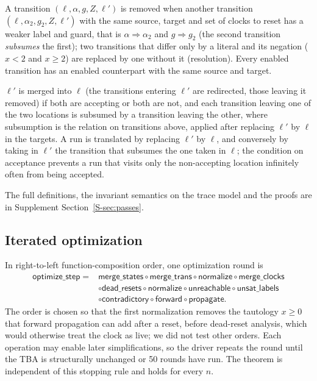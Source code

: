 \documentclass[preprint,12pt]{elsarticle}
\begin{document}
\begin{description}[leftmargin=0pt,labelindent=0pt,itemsep=0pt]
\item[Merging of transitions.] A transition $(\ell,\alpha,g,Z,\ell')$ is removed when another transition $(\ell,\alpha_2,g_2,Z,\ell')$ with the same source, target and set of clocks to reset has a weaker label and guard, that is $\alpha\Rightarrow\alpha_2$ and $g\Rightarrow g_2$ (the second transition \emph{subsumes} the first); two transitions that differ only by a literal and its negation ($x<2$ and $x\ge2$) are replaced by one without it (resolution). Every enabled transition has an enabled counterpart with the same source and target.
\item[Merging of locations.] $\ell'$ is merged into $\ell$ (the transitions entering $\ell'$ are redirected, those leaving it removed) if both are accepting or both are not, and each transition leaving one of the two locations is subsumed by a transition leaving the other, where subsumption is the relation on transitions above, applied after replacing $\ell'$ by $\ell$ in the targets. A run is translated by replacing $\ell'$ by $\ell$, and conversely by taking in $\ell'$ the transition that subsumes the one taken in $\ell$; the condition on acceptance prevents a run that visits only the non-accepting location infinitely often from being accepted.
\end{description}
The full definitions, the invariant semantics on the trace model and the proofs are in Supplement Section~\ref{S-sec:passes}.

\subsection{Iterated optimization}
\label{sec:main-pipeline}
In right-to-left function-composition order, one optimization round is
\[
\begin{aligned}
\mathsf{optimize\_step}={}&\mathsf{merge\_states}\circ\mathsf{merge\_trans}\circ\mathsf{normalize}\circ\mathsf{merge\_clocks}\\
 &\circ\mathsf{dead\_resets}\circ\mathsf{normalize}\circ\mathsf{unreachable}\circ\mathsf{unsat\_labels}\\
 &\circ\mathsf{contradictory}\circ\mathsf{forward}\circ\mathsf{propagate}.
\end{aligned}
\]
The order is chosen so that the first normalization removes the tautology
$x\ge0$ that forward propagation can add after a reset, before dead-reset
analysis, which would otherwise treat the clock as live; we did not test
other orders. Each operation may enable
later simplifications, so the driver repeats the round until the TBA is
structurally unchanged or 50 rounds have run. The theorem is independent of
this stopping rule and holds for every $n$.
\end{document}
